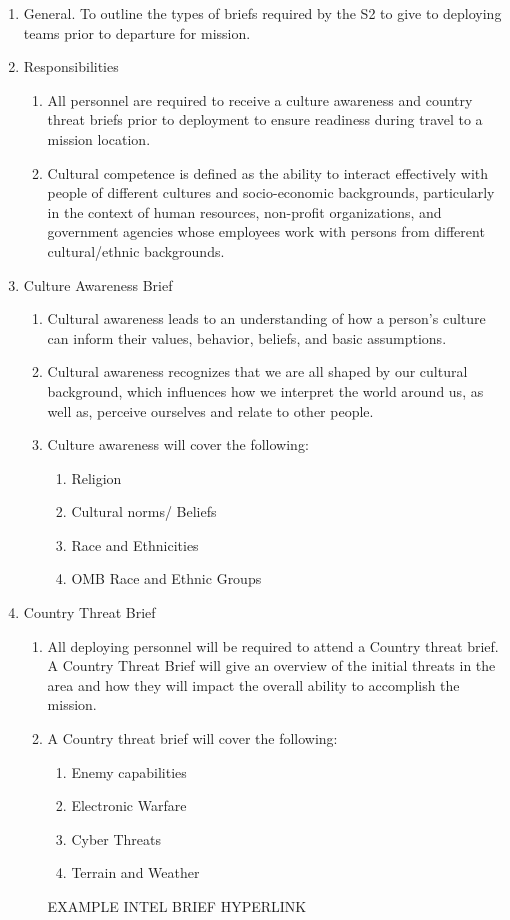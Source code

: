 \documentclass{article}
\begin{document}
\begin{enumerate}
    \item  General. To outline the types of briefs required by the S2 to give to deploying teams prior to departure for mission.
\item Responsibilities
\begin{enumerate}
    \item All personnel are required to receive a culture awareness and country threat briefs prior to deployment to ensure readiness during travel to a mission location.
\item Cultural competence is defined as the ability to interact effectively with people of different cultures and socio-economic backgrounds, particularly in the context of human resources, non-profit organizations, and government agencies whose employees work with persons from different cultural/ethnic backgrounds.
\end{enumerate}
\item  Culture Awareness Brief
\begin{enumerate}
    \item Cultural awareness leads to an understanding of how a person’s culture can inform their values, behavior, beliefs, and basic assumptions.
\item Cultural awareness recognizes that we are all shaped by our cultural background, which influences how we interpret the world around us, as well as, perceive ourselves and relate to other people.
\item Culture awareness will cover the following:
\begin{enumerate}
    \item Religion
\item	Cultural norms/ Beliefs
\item	Race and Ethnicities 
\item	OMB Race and Ethnic Groups
\end{enumerate}
\end{enumerate}
\item Country Threat Brief 
\begin{enumerate}
    \item  All deploying personnel will be required to attend a Country threat brief. A Country Threat Brief will give an overview of the initial threats in the area and how they will impact the overall ability to accomplish the mission. 
    \item A Country threat brief will cover the following:
    \begin{enumerate}
        \item 	Enemy capabilities
\item Electronic Warfare
\item	Cyber Threats
\item Terrain and Weather
 \end{enumerate}
EXAMPLE INTEL BRIEF HYPERLINK
\end{enumerate}
\end{enumerate}
\end{document}
